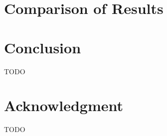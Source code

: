 \documentclass[10pt, conference]{IEEEtran}
\begin{document}
\section{Comparison of Results}
\label{sec:comparison-results}

\section{Conclusion}
\label{sec:conclusion}

TODO

\section*{Acknowledgment}
TODO

\balance


\end{document}
